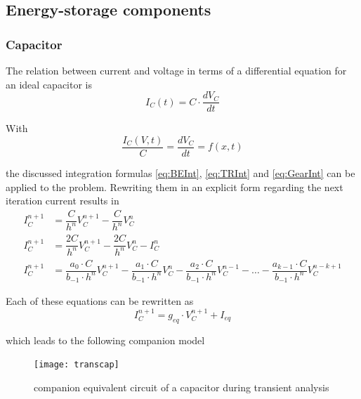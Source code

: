\documentclass[10pt]{report}
\begin{document}
\subsection{Energy-storage components}

\subsubsection{Capacitor}

The relation between current and voltage in terms of a differential
equation for an ideal capacitor is
\begin{equation}
I_C(t) = C\cdot \dfrac{d V_C}{d t}
\end{equation}

With
\begin{equation}
\dfrac{I_C(V, t)}{C} = \dfrac{d V_C}{d t} = f(x,t)
\end{equation}

the discussed integration formulas \eqref{eq:BEInt}, \eqref{eq:TRInt}
and \eqref{eq:GearInt} can be applied to the problem.  Rewriting them
in an explicit form regarding the next iteration current results in
\begin{align}
I_C^{n+1} &= \dfrac{C}{h^{n}} V_C^{n+1} - \dfrac{C}{h^{n}} V_C^{n}\\
I_C^{n+1} &= \dfrac{2C}{h^{n}} V_C^{n+1} - \dfrac{2C}{h^{n}} V_C^{n} - I_C^n\\
I_C^{n+1} &= \dfrac{a_0\cdot C}{b_{-1}\cdot h^{n}} V_C^{n+1} - \dfrac{a_1\cdot C}{b_{-1}\cdot h^{n}} V_C^{n} - \dfrac{a_2\cdot C}{b_{-1}\cdot h^{n}} V_C^{n-1} - \ldots - \dfrac{a_{k-1}\cdot C}{b_{-1}\cdot h^{n}} V_C^{n-k+1} 
\end{align}

Each of these equations can be rewritten as
\begin{equation}
I_C^{n+1} = g_{eq}\cdot V_C^{n+1} + I_{eq}
\end{equation}

which leads to the following companion model
\begin{figure}[ht]
\begin{center}
\texttt{[image: transcap]}
\end{center}
\caption{companion equivalent circuit of a capacitor during transient analysis}
\end{figure}
\FloatBarrier
\end{document}
